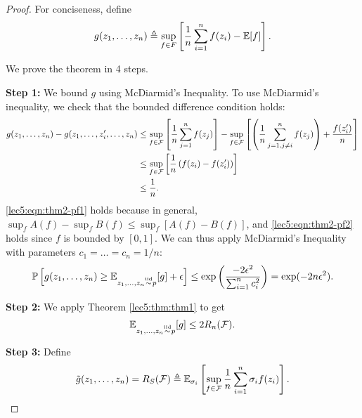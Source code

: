 \begin{proof}
For conciseness, define
\begin{equation} g(z_1, \dots, z_n) \triangleq \sup_{f\in F} \left[ \frac{1}{n} \sum^{n}_{i=1} f(z_i) - \mathbb E[f]\right]. \end{equation}

We prove the theorem in 4 steps.

\textbf{Step 1:} We bound $g$ using McDiarmid's Inequality. To use McDiarmid's inequality, we check that the bounded difference condition holds:
\begin{align}
    g(z_1, \dots, z_n) - g(z_1, \dots, z_i', \dots, z_n)
    &\leq \sup_{f\in \mathcal F} \left[ \frac{1}{n} \sum^{n}_{j=1} f(z_j) \right] - \sup_{f\in \mathcal F} \left[ \left(\frac{1}{n} \sum^{n}_{j=1, j \neq i} f(z_j)\right) + \frac{f(z_i')}{n} \right]  \\
    &\leq \sup_{f\in \mathcal F}\left[ \frac{1}{n} \left( f(z_i) - f(z_i') \right) \right] \label{lec5:eqn:thm2-pf1} \\
    &\leq \frac{1}{n}. \label{lec5:eqn:thm2-pf2}
\end{align}
\eqref{lec5:eqn:thm2-pf1} holds because in general, $\sup_f A(f) - \sup_f B(f) \leq \sup_f [A(f) - B(f)]$, and \eqref{lec5:eqn:thm2-pf2} holds since $f$ is bounded by $[0,1]$. We can thus apply McDiarmid's Inequality with parameters $c_1 = \dots = c_n = 1/n$:
\begin{align}
    \mathbb P\left[ g(z_1, \dots, z_n) \geq \mathbb E_{z_1,\dots, z_n \overset{\textup{iid}}{\sim} p}[g] + \epsilon \right] \leq \exp{\left( \frac{-2\epsilon^2}{\sum^n_{i=1} c_i^2 }\right)} = \exp(-2n\epsilon^2).
\end{align}

\textbf{Step 2:} We apply Theorem \ref{lec5:thm:thm1} to get 
\begin{align}
 \mathbb E_{z_1,\dots, z_n \overset{\textup{iid}}{\sim} p}[g] \leq 2R_n(\mathcal F).
\end{align}

\textbf{Step 3:} Define
\begin{equation} \tilde g (z_1, \dots, z_n) = R_S(\mathcal F) \triangleq \mathbb E_{\sigma_i}\left[\sup_{f\in \mathcal F} \frac{1}{n} \sum^n_{i=1} \sigma_i f(z_i)\right]. \end{equation}


\end{proof}
